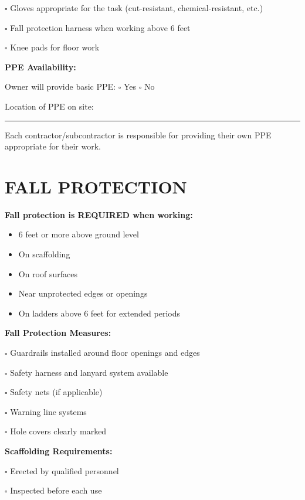 \documentclass[11pt,letterpaper]{article}
\begin{document}
$\square$ Gloves appropriate for the task (cut-resistant, chemical-resistant, etc.)

$\square$ Fall protection harness when working above 6 feet

$\square$ Knee pads for floor work

\vspace{6pt}

\textbf{PPE Availability:}

Owner will provide basic PPE: $\square$ Yes $\square$ No

Location of PPE on site: \rule{7cm}{0.4pt}

Each contractor/subcontractor is responsible for providing their own PPE appropriate for their work.

\newpage

\section*{FALL PROTECTION}

\textbf{Fall protection is REQUIRED when working:}

\begin{itemize}[leftmargin=0.5in]
\item 6 feet or more above ground level
\item On scaffolding
\item On roof surfaces
\item Near unprotected edges or openings
\item On ladders above 6 feet for extended periods
\end{itemize}

\vspace{6pt}

\textbf{Fall Protection Measures:}

$\square$ Guardrails installed around floor openings and edges

$\square$ Safety harness and lanyard system available

$\square$ Safety nets (if applicable)

$\square$ Warning line systems

$\square$ Hole covers clearly marked

\vspace{6pt}

\textbf{Scaffolding Requirements:}

$\square$ Erected by qualified personnel

$\square$ Inspected before each use
\end{document}
